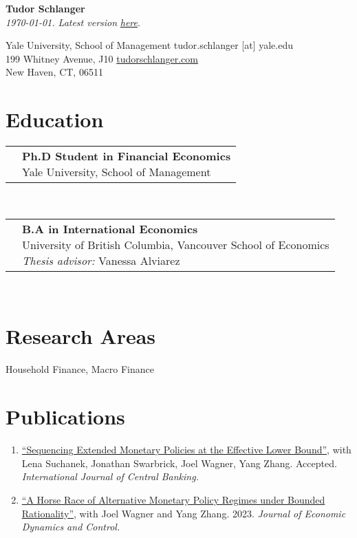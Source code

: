 \documentclass[letterpaper,10pt]{article}
\newcommand{\educItem}[4]{
		\vspace{0.2em} 	\begin{tabular*}{0.99\textwidth}[t]{lp{\labelsep}}
	      \eqparbox[t]{dates}{\ \ \ \ #1 \ \ \ \ } & \eqparbox[t]{educList}{\textbf{#2} \\ #3 \\ #4}
	   \end{tabular*} \vspace{0.2em} \\
		}
\newcommand{\pubSubHeadingListStart}{\begin{enumerate}[leftmargin=1em]}
\newcommand{\pubSubHeadingListEnd}{\end{enumerate}\vspace{-5pt}}
\newcommand{\pubItem}[3]{
	  \item{
	    \href{#1}{``#2''}{, with #3 \vspace{-2pt}}
	  }
	}
\begin{document}

\begin{center}
    \textbf{\Large  Tudor Schlanger} \\
    \textit{\today. Latest version} \href{https://raw.githubusercontent.com/tudorschlanger/cv/main/cv.pdf}{\textit{here}}.
\end{center}

Yale University, School of Management \hfill tudor.schlanger [at] yale.edu\\
199 Whitney Avenue, J10  			  \hfill \href{https://www.tudorschlanger.com}{tudorschlanger.com} \\
New Haven, CT, 06511				  \hfill  


\section{Education}
\educItem{2023-Present}{Ph.D Student in Financial Economics}{Yale University, School of Management}{} 
\educItem{2019}{B.A in International Economics}{University of British Columbia, Vancouver School of Economics}{\textit{Thesis advisor:} Vanessa Alviarez} 

\section{Research Areas}

\hspace{1em} Household Finance, Macro Finance



\section{Publications}

\pubSubHeadingListStart
	\pubItem{https://www.bankofcanada.ca/wp-content/uploads/2021/07/sdp2021-10.pdf}{Sequencing Extended Monetary Policies at the Effective Lower Bound}{Lena Suchanek, Jonathan Swarbrick, Joel Wagner, Yang Zhang. Accepted. \textit{International Journal of Central Banking.}}
	\pubItem{https://www.dropbox.com/scl/fi/j163cbxanc4ij4jcdauxt/draft_paper_20230724_prepublish.pdf?rlkey=zgvazmtdvw3xdgurn0ry6qykb&e=1&dl=0}{A Horse Race of Alternative Monetary Policy Regimes under Bounded Rationality}{Joel Wagner and Yang Zhang. 2023. \textit{Journal of Economic Dynamics and Control. }}
\pubSubHeadingListEnd
\end{document}
